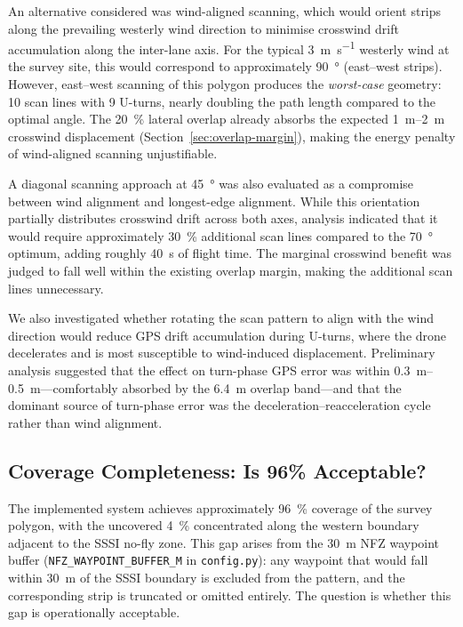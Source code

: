 An alternative considered was wind-aligned scanning, which would orient strips along the prevailing westerly wind direction to minimise crosswind drift accumulation along the inter-lane axis. For the typical \SI{3}{\metre\per\second} westerly wind at the survey site, this would correspond to approximately \SI{90}{\degree} (east--west strips). However, east--west scanning of this polygon produces the \emph{worst-case} geometry: 10 scan lines with 9 U-turns, nearly doubling the path length compared to the optimal angle. The \SI{20}{\percent} lateral overlap already absorbs the expected \SIrange{1}{2}{\metre} crosswind displacement (Section~\ref{sec:overlap-margin}), making the energy penalty of wind-aligned scanning unjustifiable.

A diagonal scanning approach at \SI{45}{\degree} was also evaluated as a compromise between wind alignment and longest-edge alignment. While this orientation partially distributes crosswind drift across both axes, analysis indicated that it would require approximately \SI{30}{\percent} additional scan lines compared to the \SI{70}{\degree} optimum, adding roughly \SI{40}{\second} of flight time. The marginal crosswind benefit was judged to fall well within the existing overlap margin, making the additional scan lines unnecessary.

We also investigated whether rotating the scan pattern to align with the wind direction would reduce GPS drift accumulation during U-turns, where the drone decelerates and is most susceptible to wind-induced displacement. Preliminary analysis suggested that the effect on turn-phase GPS error was within \SIrange{0.3}{0.5}{\metre}---comfortably absorbed by the \SI{6.4}{\metre} overlap band---and that the dominant source of turn-phase error was the deceleration--reacceleration cycle rather than wind alignment.

\subsection{Coverage Completeness: Is 96\% Acceptable?}\label{sec:coverage-96-old}

The implemented system achieves approximately \SI{96}{\percent} coverage of the survey polygon, with the uncovered \SI{4}{\percent} concentrated along the western boundary adjacent to the SSSI no-fly zone. This gap arises from the \SI{30}{\metre} NFZ waypoint buffer (\texttt{NFZ\_WAYPOINT\_BUFFER\_M} in \texttt{config.py}): any waypoint that would fall within \SI{30}{\metre} of the SSSI boundary is excluded from the pattern, and the corresponding strip is truncated or omitted entirely. The question is whether this gap is operationally acceptable.

